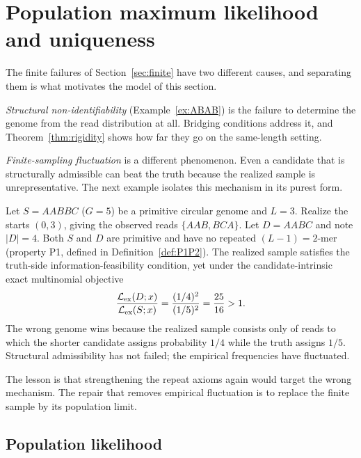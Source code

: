 \section{Population maximum likelihood and uniqueness}
\label{sec:population}

The finite failures of Section~\ref{sec:finite} have two different causes, and
separating them is what motivates the model of this section.

\emph{Structural non-identifiability} (Example~\ref{ex:ABAB}) is the failure to
determine the genome from the read distribution at all. Bridging conditions
address it, and Theorem~\ref{thm:rigidity} shows how far they go on the
same-length setting.

\emph{Finite-sampling fluctuation} is a different phenomenon. Even a candidate
that is structurally admissible can beat the truth because the realized sample
is unrepresentative. The next example isolates this mechanism in its purest
form.

\begin{example}
\label{ex:frequencies}
Let $S=AABBC$ ($G=5$) be a primitive circular genome and $L=3$. Realize the
starts $(0,3)$, giving the observed reads $\{AAB,BCA\}$. Let $D=AABC$ and note
$|D|=4$. Both $S$ and $D$ are primitive and have no repeated
$(L-1)=2$-mer (property P1, defined in
Definition~\ref{def:P1P2}). The realized sample satisfies the truth-side
information-feasibility condition, yet under the candidate-intrinsic exact
multinomial objective
\[
  \frac{\mathcal{L}_{\mathrm{ex}}(D;x)}{\mathcal{L}_{\mathrm{ex}}(S;x)}
  = \frac{(1/4)^2}{(1/5)^2} = \frac{25}{16} > 1 .
\]
The wrong genome wins because the realized sample consists only of reads to
which the shorter candidate assigns probability $1/4$ while the truth assigns
$1/5$. Structural admissibility has not failed; the empirical frequencies have
fluctuated.

\end{example}

The lesson is that strengthening the repeat axioms again would target the wrong
mechanism. The repair that removes empirical fluctuation is to replace the
finite sample by its population limit.

\subsection{Population likelihood}

